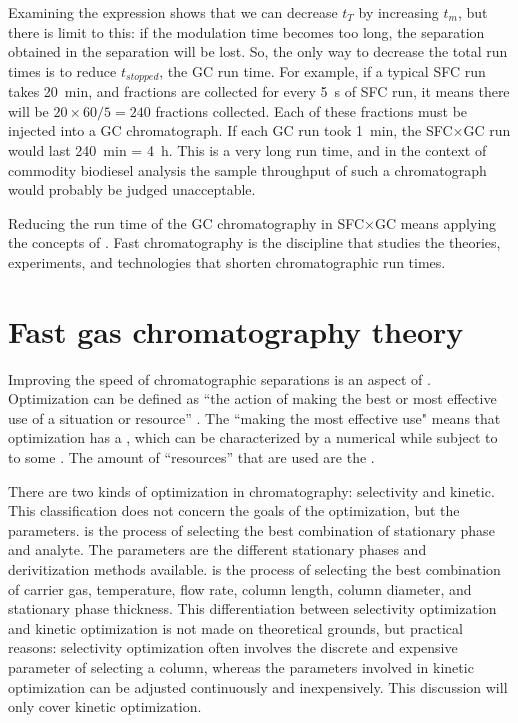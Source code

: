 Examining the expression shows that we can decrease \(t_T\) by increasing
\(t_m\), but there is limit to this: if the modulation time becomes too long,
the separation obtained in the \oneD separation will be lost. So, the only way
to decrease the total run times is to reduce \(t_{stopped}\), the GC run time.
For example, if a typical SFC run takes \SI{20}{\minute}, and fractions are
collected for every \SI{5}{\second} of SFC run, it means there will be \( 20
\times 60 / 5 = 240 \) fractions collected. Each of these fractions must be
injected into a GC chromatograph. If each GC run took \SI{1}{\minute}, the
SFC×GC run would last \SI{240}{\minute} = \SI{4}{\hour}. This is a very long
run time, and in the context of commodity biodiesel analysis the sample
throughput of such a chromatograph would probably be judged unacceptable. 

Reducing the run time of the \twoD GC chromatography in SFC×GC means applying
the concepts of . Fast chromatography is the
discipline that studies the theories, experiments, and technologies that shorten
chromatographic run times.

\section{Fast gas chromatography theory}

Improving the speed of chromatographic separations is an aspect of
. Optimization can be defined as ``the action of making
the best or most effective use of a situation or resource'' \autocite{OUP2019}.
The ``making the most effective use" means that optimization has a
, which can be characterized by a numerical 
while subject to to some . The amount of ``resources'' that
are used are the .

There are two kinds of optimization in chromatography: selectivity and kinetic.
This classification does not concern the goals of the optimization, but the
parameters.  is the process of selecting the
best combination of stationary phase and analyte. The parameters are the
different stationary phases and derivitization methods available.
 is the process of selecting the best combination
of carrier gas, temperature, flow rate, column length, column diameter, and
stationary phase thickness. This differentiation between selectivity
optimization and kinetic optimization is not made on theoretical grounds, but
practical reasons: selectivity optimization often involves the discrete and
expensive parameter of selecting a column, whereas the parameters involved in
kinetic optimization can be adjusted continuously and inexpensively. This
discussion will only cover kinetic optimization.



